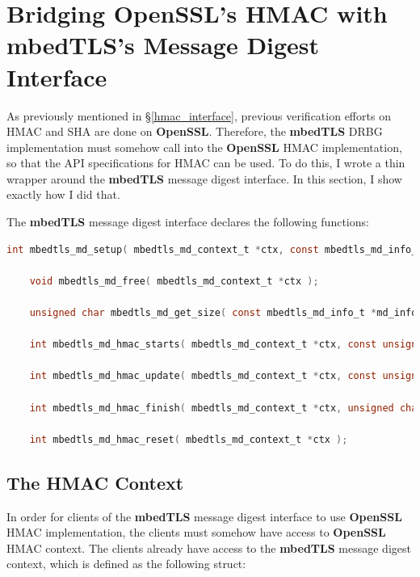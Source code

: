 \documentclass[pageno]{jpaper}
\newcommand{\stdtitle}[1]{\textbf{#1}}
\begin{document}



\clearpage
\appendix
\appendixpage
\section{Bridging OpenSSL’s HMAC with mbedTLS’s Message Digest Interface} \label{appendix_hmac}

As previously mentioned in \S \ref{hmac_interface}, previous verification efforts on HMAC and SHA are done on \stdtitle{OpenSSL}. Therefore, the \stdtitle{mbedTLS} DRBG implementation must somehow call into the \stdtitle{OpenSSL} HMAC implementation, so that the API specifications for HMAC can be used. To do this, I wrote a thin wrapper around the \stdtitle{mbedTLS} message digest interface. In this section, I show exactly how I did that.

The \stdtitle{mbedTLS} message digest interface declares the following functions:

\begin{lstlisting}[language=C]
    int mbedtls_md_setup( mbedtls_md_context_t *ctx, const mbedtls_md_info_t *md_info, int hmac );

    void mbedtls_md_free( mbedtls_md_context_t *ctx );

    unsigned char mbedtls_md_get_size( const mbedtls_md_info_t *md_info );

    int mbedtls_md_hmac_starts( mbedtls_md_context_t *ctx, const unsigned char *key, size_t keylen );

    int mbedtls_md_hmac_update( mbedtls_md_context_t *ctx, const unsigned char *input, size_t ilen );

    int mbedtls_md_hmac_finish( mbedtls_md_context_t *ctx, unsigned char *output);

    int mbedtls_md_hmac_reset( mbedtls_md_context_t *ctx );
\end{lstlisting}

\subsection{The HMAC Context}

In order for clients of the \stdtitle{mbedTLS} message digest interface to use \stdtitle{OpenSSL} HMAC implementation, the clients must somehow have access to \stdtitle{OpenSSL} HMAC context. The clients already have access to the \stdtitle{mbedTLS} message digest context, which is defined as the following struct:
\end{document}
